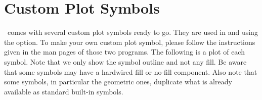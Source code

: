 %
%
\chapter{Custom Plot Symbols}
\label{app:N}
\thispagestyle{headings}

\GMT\ comes with several custom plot symbols ready to go.  They are used in 
and  using the  option.  To make your own custom plot symbol,
please follow the instructions given in the man pages of those two programs.  The following is
a plot of each symbol.  Note that we only show the symbol outline and not any fill.
Be aware that some symbols may have a hardwired fill or no-fill component. Also
note that some symbols, in particular the geometric ones, duplicate what
is already available as standard built-in symbols. \\ 



